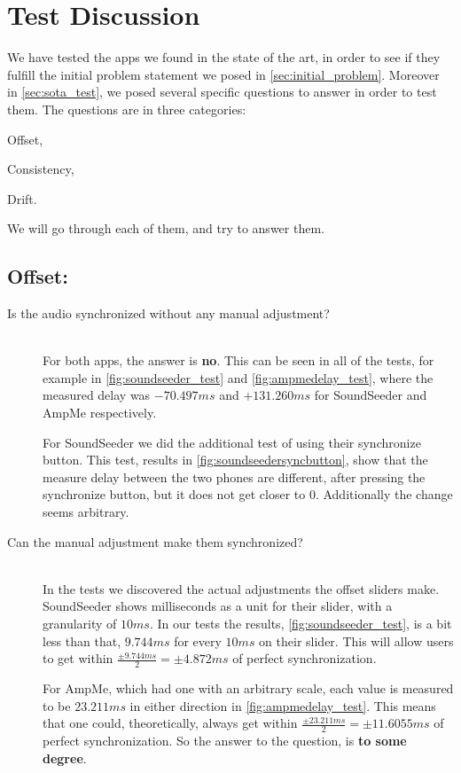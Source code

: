 \section{Test Discussion}

We have tested the apps we found in the state of the art, in order to see if they fulfill the initial problem statement we posed in \vref{sec:initial_problem}.
Moreover in \vref{sec:sota_test}, we posed several specific questions to answer in order to test them. 
The questions are in three categories: 
\begin{enumerate*}[label=(\alph*)]
    \item Offset,
    \item Consistency,
    \item Drift.
\end{enumerate*}
We will go through each of them, and try to answer them.

\subsection*{Offset:}
\begin{description}
    \item[Is the audio synchronized without any manual adjustment?] \hfill \\
    For both apps, the answer is \textbf{no}. 
    This can be seen in all of the tests, for example in \vref{fig:soundseeder_test} and \vref{fig:ampmedelay_test}, where the measured delay was $-70.497 ms$ and $+131.260 ms$ for SoundSeeder and AmpMe respectively.
    
    For SoundSeeder we did the additional test of using their synchronize button. 
    This test, results in \vref{fig:soundseedersyncbutton}, show that the measure delay between the two phones are different, after pressing the synchronize button, but it does not get closer to $0$. 
    Additionally the change seems arbitrary.  
    \item[Can the manual adjustment make them synchronized?] \hfill \\
    In the tests we discovered the actual adjustments the offset sliders make. 
    SoundSeeder shows milliseconds as a unit for their slider, with a granularity of $10 ms$.
    In our tests the results, \vref{fig:soundseeder_test}, is a bit less than that, $9.744 ms$ for every $10 ms$ on their slider.
    This will allow users to get within $\frac{\pm9.744 ms}{2}=\pm 4.872 ms$ of perfect synchronization.
    
    For AmpMe, which had one with an arbitrary scale, each value is measured to be $23.211 ms$ in either direction in \vref{fig:ampmedelay_test}.
    This means that one could, theoretically, always get within $\frac{\pm23.211 ms}{2}=\pm 11.6055 ms$ of perfect synchronization. 
    So the answer to the question, is \textbf{to some degree}.
\end{description}

